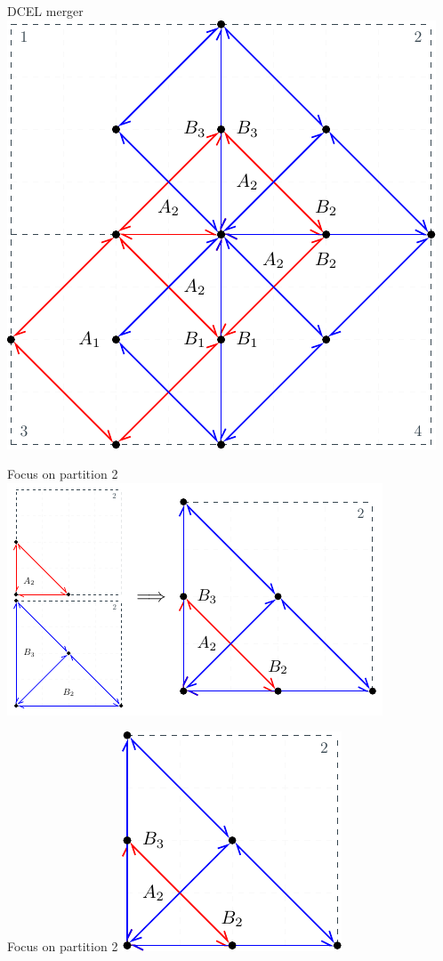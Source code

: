 \documentclass{beamer}
\begin{document}
\begin{frame}{DCEL merger}
    \centering 
    \includegraphics[width=0.5\linewidth]{figures/MergeParts} 
\end{frame}

\begin{frame}{Focus on partition 2}
    \centering 
    \includegraphics[width=0.9\linewidth]{figures/Part2} 
\end{frame}

\begin{frame}{Focus on partition 2}
    \centering 
    \includegraphics[width=0.6\linewidth]{figures/Part2Overlap} 
\end{frame}
\end{document}
